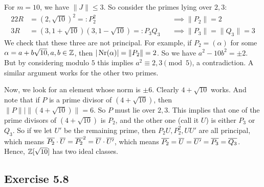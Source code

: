 \documentclass[../Marcus.tex]{subfiles}
\begin{document}
For $m=10$, we have $\|J\| \leq 3$. So consider the primes lying over $2,3$:
\begin{alignat*}{2}
2R &= (2,\sqrt{10})^2 =: P_2^2  &&\implies \|P_2\| = 2    \\
3R &= (3,1+\sqrt{10})(3,1-\sqrt{10}) =: P_3Q_3   &&\implies \|P_3\| = \|Q_3\| = 3
\end{alignat*}
We check that these three are not principal. For example, if $P_2 = (\alpha)$ for some $\alpha=a+b\sqrt{10},a,b\in \mathbb{Z}$, then $|\operatorname{Nr}(\alpha)| = \|P_2\| = 2$. So we have $a^2-10b^2 = \pm2$. But by considering modulo $5$ this implies $a^2 \equiv 2,3 \pmod{5}$, a contradiction. A similar argument works for the other two primes.

Now, we look for an element whose norm is $\pm6$. Clearly $4+\sqrt{10}$ works. And note that if $P$ is a prime divisor of $(4+\sqrt{10})$, then $\|P\| \mid \|(4+\sqrt{10})\| = 6$. So $P$ must lie over $2,3$. This implies that one of the prime divisors of $(4+\sqrt{10})$ is $P_2$, and the other one (call it $U$) is either $P_3$ or $Q_3$. So if we let $U'$ be the remaining prime, then $P_2U,P_2^2,UU'$ are all principal, which means $\overline{P_2} \cdot \overline{U} = \overline{P_2}^2 = \overline{U} \cdot \overline{U'}$, which means $\overline{P_2} = \overline{U}= \overline{U'} = \overline{P_3} = \overline{Q_3}$. Hence, $\mathbb{Z}[\sqrt{10}]$ has two ideal classes.

\subsection*{Exercise 5.8}

\begin{comment}
For $m=223$, we have $\|J\| \leq 14$. So consider the primes lying over $2,3,5,7,11,13$:
\begin{align*}
2R &= (2,1+\sqrt{223})^2   \\
3R &= (3,1+\sqrt{223})(3,1-\sqrt{223})    \\
5R &= \text{prime}    \\
7R &= \text{prime}    \\
11R &= (11,5+\sqrt{223})(11,5-\sqrt{223})    \\
13R &= \text{ prime}
\end{align*}

We look for an element whose norm is $\pm2$: $15+\sqrt{223}$ works. So $\|(15+\sqrt{223})\| = 2$, which is a prime. This implies $(15+\sqrt{223})$ is a prime lying over $2$. Hence, $(2,1+\sqrt{223}) = (15+\sqrt{223})$ is principal.
\end{comment}
\end{document}
